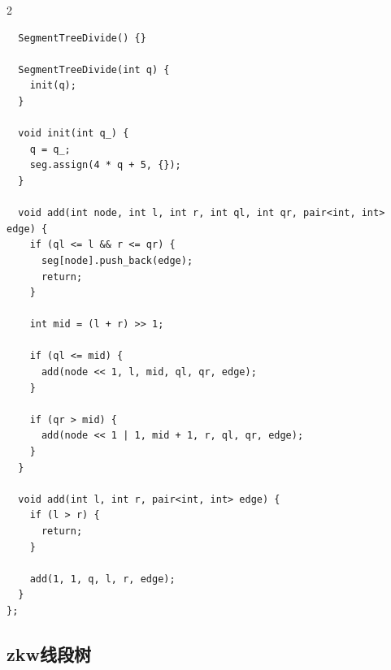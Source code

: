 \begin{multicols*}{2}
\begin{verbatim}
  SegmentTreeDivide() {}

  SegmentTreeDivide(int q) {
    init(q);
  }

  void init(int q_) {
    q = q_;
    seg.assign(4 * q + 5, {});
  }

  void add(int node, int l, int r, int ql, int qr, pair<int, int> edge) {
    if (ql <= l && r <= qr) {
      seg[node].push_back(edge);
      return;
    }

    int mid = (l + r) >> 1;

    if (ql <= mid) {
      add(node << 1, l, mid, ql, qr, edge);
    }

    if (qr > mid) {
      add(node << 1 | 1, mid + 1, r, ql, qr, edge);
    }
  }

  void add(int l, int r, pair<int, int> edge) {
    if (l > r) {
      return;
    }

    add(1, 1, q, l, r, edge);
  }
};
		\end{verbatim}

		\subsection{zkw线段树}


\end{multicols*}
